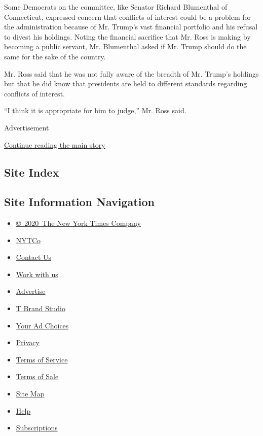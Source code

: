 Some Democrats on the committee, like Senator Richard Blumenthal of
Connecticut, expressed concern that conflicts of interest could be a
problem for the administration because of Mr. Trump's vast financial
portfolio and his refusal to divest his holdings. Noting the financial
sacrifice that Mr. Ross is making by becoming a public servant, Mr.
Blumenthal asked if Mr. Trump should do the same for the sake of the
country.

Mr. Ross said that he was not fully aware of the breadth of Mr. Trump's
holdings but that he did know that presidents are held to different
standards regarding conflicts of interest.

``I think it is appropriate for him to judge,'' Mr. Ross said.

Advertisement

\protect\hyperlink{after-bottom}{Continue reading the main story}

\hypertarget{site-index}{%
\subsection{Site Index}\label{site-index}}

\hypertarget{site-information-navigation}{%
\subsection{Site Information
Navigation}\label{site-information-navigation}}

\begin{itemize}
\tightlist
\item
  \href{https://help.nytimes.com/hc/en-us/articles/115014792127-Copyright-notice}{©~2020~The
  New York Times Company}
\end{itemize}

\begin{itemize}
\tightlist
\item
  \href{https://www.nytco.com/}{NYTCo}
\item
  \href{https://help.nytimes.com/hc/en-us/articles/115015385887-Contact-Us}{Contact
  Us}
\item
  \href{https://www.nytco.com/careers/}{Work with us}
\item
  \href{https://nytmediakit.com/}{Advertise}
\item
  \href{http://www.tbrandstudio.com/}{T Brand Studio}
\item
  \href{https://www.nytimes.com/privacy/cookie-policy\#how-do-i-manage-trackers}{Your
  Ad Choices}
\item
  \href{https://www.nytimes.com/privacy}{Privacy}
\item
  \href{https://help.nytimes.com/hc/en-us/articles/115014893428-Terms-of-service}{Terms
  of Service}
\item
  \href{https://help.nytimes.com/hc/en-us/articles/115014893968-Terms-of-sale}{Terms
  of Sale}
\item
  \href{https://spiderbites.nytimes.com}{Site Map}
\item
  \href{https://help.nytimes.com/hc/en-us}{Help}
\item
  \href{https://www.nytimes.com/subscription?campaignId=37WXW}{Subscriptions}
\end{itemize}
